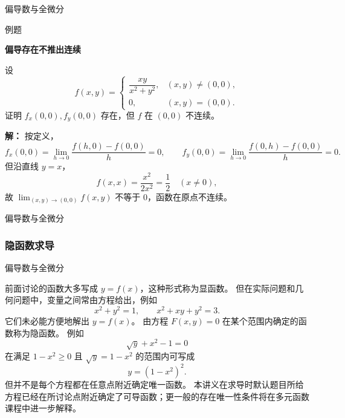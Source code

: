 \documentclass[aspectratio=169,10pt,fontset=fandol]{ctexbeamer}
\newenvironment{warning}{\par\noindent\textbf{注：}\quad}{\par\vspace{0.8em}}
\begin{document}
\begin{frame}[t,fragile]{偏导数与全微分}
\footnotesize
\begin{block}{例题}
{\footnotesize
\textbf{偏导存在不推出连续}\par

设
\[
f(x,y)=
\begin{cases}
\dfrac{xy}{x^2+y^2},&(x,y)\neq(0,0),\\[0.6em]
0,&(x,y)=(0,0).
\end{cases}
\]
证明 $f_x(0,0),f_y(0,0)$ 存在，但 $f$ 在 $(0,0)$ 不连续。

}
\end{block}
\pause
{\footnotesize
\textbf{解：}
按定义，
\[
f_x(0,0)=\lim_{h\to0}\frac{f(h,0)-f(0,0)}{h}=0,\qquad
f_y(0,0)=\lim_{h\to0}\frac{f(0,h)-f(0,0)}{h}=0.
\]
但沿直线 $y=x$，
\[
f(x,x)=\frac{x^2}{2x^2}=\frac12\quad(x\neq0),
\]
故 $\lim_{(x,y)\to(0,0)}f(x,y)$ 不等于 $0$，函数在原点不连续。

}
\end{frame}
\begin{frame}[t,fragile]{偏导数与全微分}
\normalsize
{\normalsize
\subsubsection*{隐函数求导}


}
\end{frame}
\begin{frame}[t,fragile]{偏导数与全微分}
\footnotesize
{\footnotesize
前面讨论的函数大多写成 $y=f(x)$，这种形式称为显函数。 但在实际问题和几何问题中，变量之间常由方程给出，例如
\[
x^2+y^2=1,\qquad x^2+xy+y^2=3.
\]
它们未必能方便地解出 $y=f(x)$。 由方程 $F(x,y)=0$ 在某个范围内确定的函数称为隐函数。 例如
\[
\sqrt{y}+x^2-1=0
\]
在满足 $1-x^2\geq0$ 且 $\sqrt{y}=1-x^2$ 的范围内可写成
\[
y=(1-x^2)^2.
\]
但并不是每个方程都在任意点附近确定唯一函数。 本讲义在求导时默认题目所给方程已经在所讨论点附近确定了可导函数；更一般的存在唯一性条件将在多元函数课程中进一步解释。


}
\end{frame}
\end{document}
